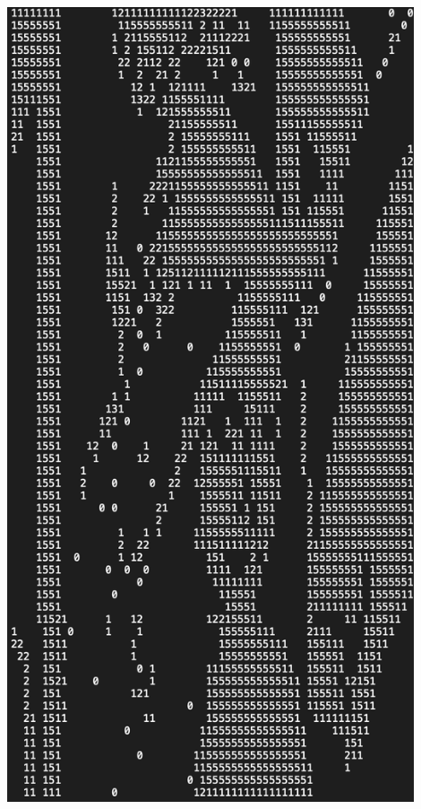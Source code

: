 \documentclass[12pt,a4paper]{article}
\begin{document}
\begin{enumerate}[label=(\alph*)]
		\includegraphics[width=0.9\textwidth]{./img/yokoi.png}\\
\end{enumerate}
\end{document}
